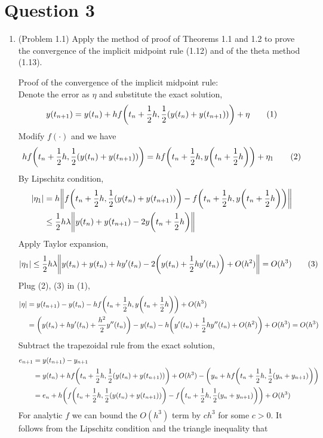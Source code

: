 \documentclass[10pt]{report}
\newcommand{\abs}[1] {\left| #1 \right|}
\DeclarePairedDelimiter\autoparen{(}{)}
\newcommand{\pa}[1]{\autoparen*{#1}}
\DeclarePairedDelimiter\autodvert{\Vert}{\Vert}
\newcommand{\norm}[1]{\autodvert*{#1}}
\begin{document}
\section*{Question 3}
\begin{enumerate}
	\item 
	(Problem 1.1) Apply the method of proof of Theorems 1.1 and 1.2 to prove the convergence of the implicit midpoint rule (1.12) and of the theta method (1.13).
	
	Proof of the convergence of the implicit midpoint rule:\\
	Denote the error as $\eta$ and substitute the exact solution,
	\[
	y(t_{n+1}) = y(t_n) + hf\pa{t_n+\frac{1}{2}h, \frac{1}{2}(y(t_n) + y(t_{n+1}))} + \eta	\tag{1}
	\]
	Modify $f(\cdot)$ and we have
	\[
	hf\pa{t_n+\frac{1}{2}h, \frac{1}{2}(y(t_n) + y(t_{n+1}))}
	= hf\pa{t_n+\frac{1}{2}h, y\pa{t_n+\frac{1}{2}h}} + \eta_1	\tag{2}
	\]
	By Lipschitz condition,
	\begin{align*}
	\abs{\eta_1} 
	&= h\norm{f\pa{t_n+\frac{1}{2}h, \frac{1}{2}(y(t_n) + y(t_{n+1}))} - f\pa{t_n+\frac{1}{2}h, y\pa{t_n+\frac{1}{2}h}}}\\
	&\le \frac{1}{2}h\lambda \norm{y(t_n) + y(t_{n+1}) - 2y\pa{t_n+\frac{1}{2}h}}
	\end{align*}
	Apply Taylor expansion,
	\[
	\abs{\eta_1} 
	\le \frac{1}{2}h\lambda \norm{y(t_n) + y(t_n) + hy'(t_n) - 2\pa{y(t_n) + \frac{1}{2}hy'(t_n)} + O(h^2)}
	= O(h^3)	\tag{3}
	\]
	Plug (2), (3) in (1),
	\begin{align*}
	\abs{\eta}
	&= y(t_{n+1}) - y(t_n) - hf\pa{t_n+\frac{1}{2}h, y\pa{t_n+\frac{1}{2}h}} + O(h^3)\\
	&= \pa{y(t_n) + hy'(t_n) + \frac{h^2}{2}y''(t_n)} - y(t_n) - h\pa{y'(t_n) + \frac{1}{2}hy''(t_n) + O(h^2)} + O(h^3) = O(h^3)
	\end{align*}
	Subtract the trapezoidal rule from the exact solution,
	\begin{align*}
		e_{n+1} &= y(t_{n+1}) - y_{n+1}\\
		&= y(t_n) + hf\pa{t_n + \frac{1}{2}h, \frac{1}{2}(y(t_n) + y(t_{n+1}))} + O(h^3) - \pa{y_n + hf\pa{t_n + \frac{1}{2}h, \frac{1}{2}(y_n + y_{n+1})}}\\
		&= e_n + h\pa{f\pa{t_n + \frac{1}{2}h, \frac{1}{2}(y(t_n) + y(t_{n+1}))} - f\pa{t_n + \frac{1}{2}h, \frac{1}{2}(y_n + y_{n+1})}} + O(h^3) 
	\end{align*}
	For analytic $f$ we can bound the $O(h^3)$ term by $ch^3$ for some $c > 0$. It follows from the Lipschitz condition and the triangle inequality that

\end{enumerate}
\end{document}
